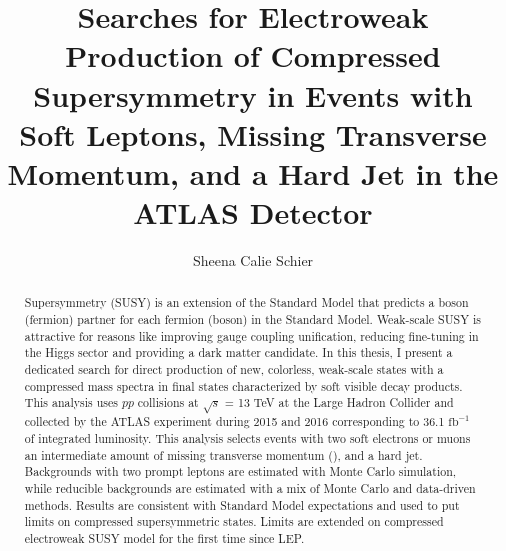 \documentclass[11pt]{ucthesis}
\begin{document}

\title{Searches for Electroweak Production of Compressed Supersymmetry in Events with Soft Leptons, Missing Transverse Momentum, and a Hard Jet in the ATLAS Detector}
\author{Sheena Calie Schier}
\deanlinethree{}
\begin{frontmatter}

\maketitle
\copyrightpage

\tableofcontents
\listoffigures
\listoftables

\makeatletter
\newcommand{\rmnum}[1]{\romannumeral #1}
\newcommand{\Rmnum}[1]{\expandafter\@slowromancap\romannumeral #1@}
\makeatother

\begin{abstract}
Supersymmetry (SUSY) is an extension of the Standard Model that predicts a boson (fermion) partner for each fermion (boson) in the Standard Model. Weak-scale SUSY is attractive for reasons like improving gauge coupling unification, reducing fine-tuning in the Higgs sector and providing a dark matter candidate. In this thesis, I present a dedicated search for direct production of new, colorless, weak-scale states with a compressed mass spectra in final states characterized by soft visible decay products. This analysis uses $pp$ collisions at $\sqrt s$ = 13 TeV at the Large Hadron Collider and collected by the ATLAS experiment during 2015 and 2016 corresponding to 36.1 $\mathrm{fb}^{-1}$ of integrated luminosity. This analysis selects events with two soft electrons or muons an intermediate amount of missing transverse momentum (\met{}), and a hard jet. Backgrounds with two prompt leptons are estimated with Monte Carlo simulation, while reducible backgrounds are estimated with a mix of Monte Carlo and data-driven methods. Results are consistent with Standard Model expectations and used to put limits on compressed supersymmetric states.  Limits are extended on compressed electroweak SUSY model for the first time since LEP.

\end{abstract}


\end{frontmatter}
\end{document}

